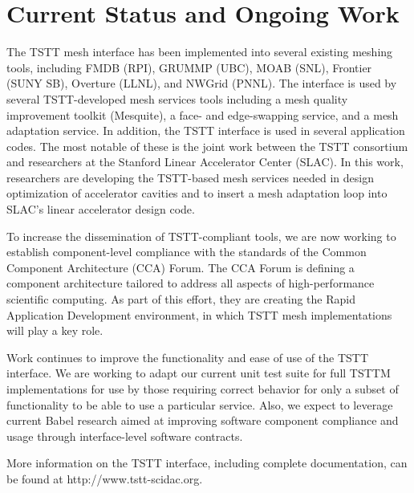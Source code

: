 
\section{Current Status and Ongoing Work\label{sec:Conclusions}}

The TSTT mesh interface has been implemented into several existing
meshing tools, including FMDB (RPI), GRUMMP (UBC), MOAB (SNL), Frontier
(SUNY SB), Overture (LLNL), and NWGrid (PNNL).  The interface is used by
several TSTT-developed mesh services tools including a mesh quality
improvement toolkit (Mesquite)\cite{Mesquite03}, a face- and
edge-swapping service\cite{TSTT-swap-tool}, and a mesh adaptation service.  In
addition, the TSTT interface is used in several
application codes.  The most notable of these is the joint work between
the TSTT consortium and researchers at the Stanford Linear Accelerator
Center (SLAC).  In this work, researchers are developing the TSTT-based
mesh services needed in design optimization of accelerator cavities and
to insert a mesh adaptation loop into SLAC's linear accelerator design
code\cite{GeLe04}.

To increase the dissemination of TSTT-compliant tools, we are now
working to establish component-level compliance with the standards of
the Common Component Architecture (CCA) Forum\cite{cca-forum}.  The CCA
Forum is defining a component architecture tailored to address all
aspects of high-performance scientific computing.  As part of this
effort, they are creating the Rapid Application Development environment,
in which TSTT mesh implementations will play a key role.

Work continues to improve the functionality and ease of use of the TSTT
interface.  We are working to adapt our current unit test suite for full
TSTTM implementations for use by those requiring correct behavior for
only a subset of functionality to be able to use a particular service.
Also, we expect to leverage current Babel research aimed at improving
software component compliance and usage through interface-level software
contracts\cite{dahlgren:sehpcs04,dahlgren:study04,dahlgren:sehpcs05}.

More information on the TSTT interface, including complete documentation,
can be found at http://www.tstt-scidac.org.

